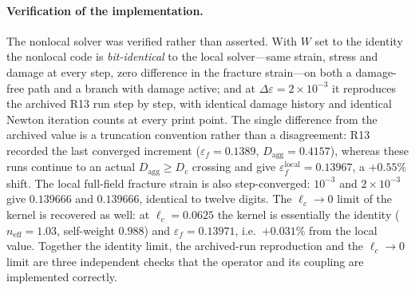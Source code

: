 \documentclass[12pt,a4paper,twocolumn]{article}
\begin{document}
\paragraph{Verification of the implementation.} The nonlocal solver was verified rather than asserted. With
$W$ set to the identity the nonlocal code is \emph{bit-identical} to the local solver---same strain, stress
and damage at every step, zero difference in the fracture strain---on both a damage-free path and a branch
with damage active; and at $\Delta\varepsilon = 2\times10^{-3}$ it reproduces the archived R13 run step by
step, with identical damage history and identical Newton iteration counts at every print point. The single
difference from the archived value is a truncation convention rather than a disagreement: R13 recorded the
last converged increment ($\varepsilon_f = 0.1389$, $D_{\mathrm{agg}} = 0.4157$), whereas these runs continue
to an actual $D_{\mathrm{agg}} \ge D_c$ crossing and give $\varepsilon_f^{\mathrm{local}} = 0.13967$, a
$+0.55\%$ shift. The local full-field fracture strain is also step-converged: $10^{-3}$ and $2\times10^{-3}$
give $0.139666$ and $0.139666$, identical to twelve digits. The $\ell_c \to 0$ limit of the kernel is
recovered as well: at $\ell_c = 0.0625$ the kernel is essentially the identity ($n_{\mathrm{eff}} = 1.03$,
self-weight $0.988$) and $\varepsilon_f = 0.13971$, i.e.\ $+0.031\%$ from the local value. Together the
identity limit, the archived-run reproduction and the $\ell_c \to 0$ limit are three independent checks that
the operator and its coupling are implemented correctly.
\end{document}
